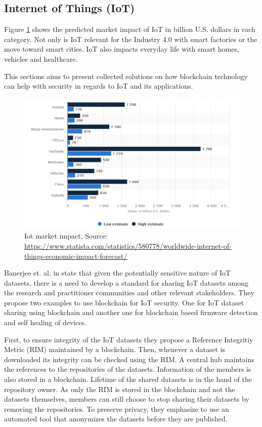 \subsection{Internet of Things (IoT)}
\label{subsec:03_IoT}

Figure \ref{fig:iot_market} shows the predicted market impact of IoT in billion U.S. dollars in each category.
Not only is IoT relevant for the Industry 4.0 with smart factories or the move toward smart cities. IoT also
impacts everyday life with smart homes, vehicles and healthcare.

This sections aims to present collected solutions on how  blockchain technology can help with security
in regards to IoT and its applications.


\begin{figure}[ht!]
  \begin{center}
    \includegraphics[scale=0.6]{Talk7/img/iot/iot_statista}
  \end{center}
  \caption{Iot market impact, Source: \protect\url{https://www.statista.com/statistics/580778/worldwide-internet-of-things-economic-impact-forecast/} }
  \label{fig:iot_market}
\end{figure}

Banerjee et. al. in \cite{Banerjee2018} state that given the potentially sensitive nature of IoT datasets,
there is a need to develop a standard for sharing IoT datasets among the research and practitioner communities
and other relevant stakeholders. They propose two examples to use blockchain for IoT security. One for IoT dataset sharing using blockchain and another one for
blockchain based firmware detection and self healing of devices.

First, to ensure integrity of the IoT datasets they propose a Reference Integritiy Metric (RIM) maintained by a blockchain. Then, whenever a dataset is downloaded its integrity can be checked using the RIM.
A central hub maintains the references to the repositories of the datasets. Information of the members is also stored in a blockchain.
Lifetime of the shared datasets is in the hand of the repository owner.
As only the RIM is stored in the blockchain and not the datasets themselves, members can still choose to stop sharing their datasets by removing the repositories.
To preserve privacy, they emphasize to use an automated tool that anonymizes the datasets before they are published.


